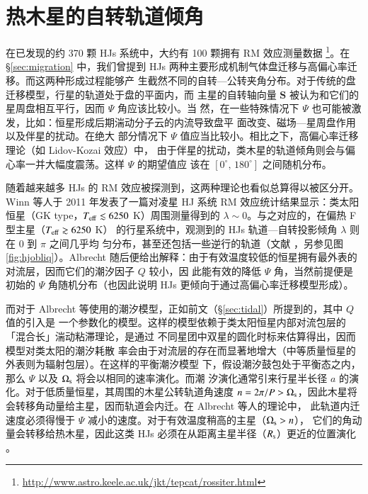 \section{热木星的自转轨道倾角}   

在已发现的约 370 颗 HJs 系统中，大约有 100 颗拥有 RM 效应测量数据
\footnote{\url{http://www.astro.keele.ac.uk/jkt/tepcat/rossiter.html}}。在 \S \ref{sec:migration} 
中，我们曾提到 HJs 两种主要形成机制气体盘迁移与高偏心率迁移。而这两种形成过程能够产
生截然不同的自转---公转夹角分布。对于传统的盘迁移模型，行星的轨道处于盘的平面内，而
主星的自转轴向量 $\bm{S} $ 被认为和它们的星周盘相互平行，因而 $\Psi$ 角应该比较小。当
然，在一些特殊情况下 $\Psi$ 也可能被激发，比如：恒星形成后期湍动分子云的内流导致盘平
面改变\cite{Bate2010}、磁场---星周盘作用\cite{Lai2011}以及伴星的扰动\cite{Lai2014}。在绝大
部分情况下 $\Psi$ 值应当比较小。相比之下，高偏心率迁移理论（如 Lidov-Kozai 效应）中，
由于伴星的扰动，类木星的轨道倾角则会与偏心率一并大幅度震荡。这样 $\Psi$ 的期望值应
该在 $[0^\circ,\,180^\circ]$ 之间随机分布。

随着越来越多 HJs 的 RM 效应被探测到，这两种理论也看似总算得以被区分开。Winn 等人于 2011 
年发表了一篇对凌星 HJ 系统 RM 效应统计结果显示：类太阳恒星（GK type，$T_\mathrm{eff} \lesssim 
6250 $ K）周围测量得到的 $\lambda \sim 0$。与之对应的，在偏热 F 型主星（$T_\mathrm{eff} \gtrsim 
6250 $ K） 的行星系统中，观测到的 HJs 轨道---自转投影倾角 $\lambda$ 则在 0 到 $\pi$ 之间几乎均
匀分布，甚至还包括一些逆行的轨道（文献 ，另参见图 \ref{fig:hjobliq}）。Albrecht 
随后便给出解释：由于有效温度较低的恒星拥有最外表的对流层，因而它们的潮汐因子 $Q$ 较小，因
此能有效的降低 $\Psi$ 角\cite{Albrecht2012}，当然前提便是初始的 $\Psi$ 角随机分布（也因此说明
HJs 更倾向于通过高偏心率迁移模型形成）。

而对于 Albrecht 等使用的潮汐模型，正如前文（\S \ref{sec:tidal}）所提到的，其中 $Q$ 值的引入是
一个参数化的模型。这样的模型依赖于类太阳恒星内部对流包层的「混合长」湍动粘滞理论，是通过
不同星团中双星的圆化时标来估算得出\cite{Zahn1977,Mathieu1994}，因而模型对类太阳的潮汐耗散
率会由于对流层的存在而显著地增大（中等质量恒星的外表则为辐射包层）。在这样的平衡潮汐模型
下，假设潮汐鼓包处于平衡态之内，那么 $\Psi$ 以及 $\Omega_\mathrm{s}$ 将会以相同的速率演化。而潮
汐演化通常引来行星半长径 $a$ 的演化。对于低质量恒星，其周围的木星公转轨道角速度 $n=2\pi/P 
> \Omega_\mathrm{s}$，因此木星将会转移角动量给主星，因而轨道会内迁。在 Albrecht 等人的理论中，
此轨道内迁速度必须得慢于 $\Psi$ 减小的速度。对于有效温度稍高的主星（$\Omega_\mathrm{s} > n$），
它们的角动量会转移给热木星，因此这类 HJs 必须在从距离主星半径（$R_\mathrm{s}$）更近的位置演化
\cite{Rogers2013}。

